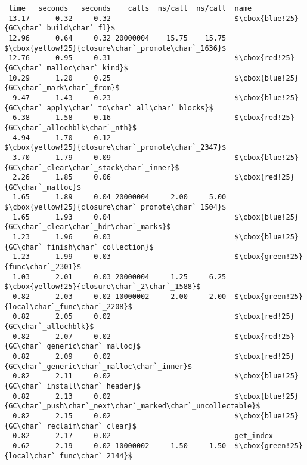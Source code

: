 \begin{lstlisting}[basicstyle=\linespread{0.8}\ttfamily\footnotesize,
basewidth={.4em,.2em}, frame=single]
  %   cumulative   self              self     total           
 time   seconds   seconds    calls  ns/call  ns/call  name    
 13.17      0.32     0.32                             $\cbox{blue!25}{GC\char`_build\char`_fl}$
 12.96      0.64     0.32 20000004    15.75    15.75  $\cbox{yellow!25}{closure\char`_promote\char`_1636}$
 12.76      0.95     0.31                             $\cbox{red!25}{GC\char`_malloc\char`_kind}$
 10.29      1.20     0.25                             $\cbox{blue!25}{GC\char`_mark\char`_from}$
  9.47      1.43     0.23                             $\cbox{blue!25}{GC\char`_apply\char`_to\char`_all\char`_blocks}$
  6.38      1.58     0.16                             $\cbox{red!25}{GC\char`_allochblk\char`_nth}$
  4.94      1.70     0.12                             $\cbox{yellow!25}{closure\char`_promote\char`_2347}$
  3.70      1.79     0.09                             $\cbox{blue!25}{GC\char`_clear\char`_stack\char`_inner}$
  2.26      1.85     0.06                             $\cbox{red!25}{GC\char`_malloc}$
  1.65      1.89     0.04 20000004     2.00     5.00  $\cbox{yellow!25}{closure\char`_promote\char`_1504}$
  1.65      1.93     0.04                             $\cbox{blue!25}{GC\char`_clear\char`_hdr\char`_marks}$
  1.23      1.96     0.03                             $\cbox{blue!25}{GC\char`_finish\char`_collection}$
  1.23      1.99     0.03                             $\cbox{green!25}{func\char`_2301}$
  1.03      2.01     0.03 20000004     1.25     6.25  $\cbox{yellow!25}{closure\char`_2\char`_1588}$
  0.82      2.03     0.02 10000002     2.00     2.00  $\cbox{green!25}{local\char`_func\char`_2208}$
  0.82      2.05     0.02                             $\cbox{red!25}{GC\char`_allochblk}$
  0.82      2.07     0.02                             $\cbox{red!25}{GC\char`_generic\char`_malloc}$
  0.82      2.09     0.02                             $\cbox{red!25}{GC\char`_generic\char`_malloc\char`_inner}$
  0.82      2.11     0.02                             $\cbox{blue!25}{GC\char`_install\char`_header}$
  0.82      2.13     0.02                             $\cbox{blue!25}{GC\char`_push\char`_next\char`_marked\char`_uncollectable}$
  0.82      2.15     0.02                             $\cbox{blue!25}{GC\char`_reclaim\char`_clear}$
  0.82      2.17     0.02                             get_index
  0.62      2.19     0.02 10000002     1.50     1.50  $\cbox{green!25}{local\char`_func\char`_2144}$

\end{lstlisting}
